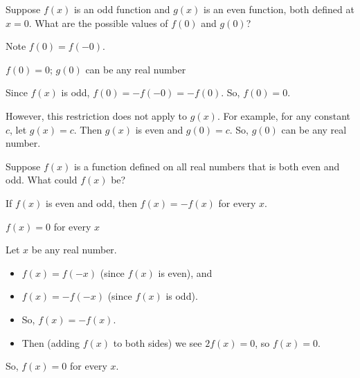
\begin{question}
Suppose $f(x)$ is an odd function and $g(x)$ is an even function, both defined at $x=0$. What are the possible values of $f(0)$ and $g(0)$?
\end{question}
\begin{hint}
Note $f(0)=f(-0)$.
\end{hint}
\begin{answer}
$f(0)=0$; $g(0)$ can be any real number
\end{answer}
\begin{solution}
Since $f(x)$ is odd, $f(0)=-f(-0)=-f(0)$. So, $f(0)=0$.

However, this restriction does not apply to $g(x)$. For example, for any constant $c$, let $g(x)=c$. Then $g(x)$ is even and $g(0)=c$. So, $g(0)$ can be any real number.
\end{solution}


\begin{question}\label{1.1_bothevenodd}
Suppose $f(x)$ is a function defined on all real numbers that is both even and odd. What could $f(x)$ be?
\end{question}
\begin{hint}
If $f(x)$ is even and odd, then $f(x)=-f(x)$ for every $x$.
\end{hint}
\begin{answer}
$f(x)=0$ for every $x$
\end{answer}
\begin{solution}
Let $x$ be any real number.
\begin{itemize}
\item $f(x)=f(-x)$ (since $f(x)$ is even), and
\item $f(x)=-f(-x)$ (since $f(x)$ is odd).
\item So, $f(x)=-f(x)$.
\item Then (adding $f(x)$ to both sides) we see $2f(x)=0$, so $f(x)=0$.
\end{itemize}
So, $f(x)=0$ for every $x$.
\end{solution}




